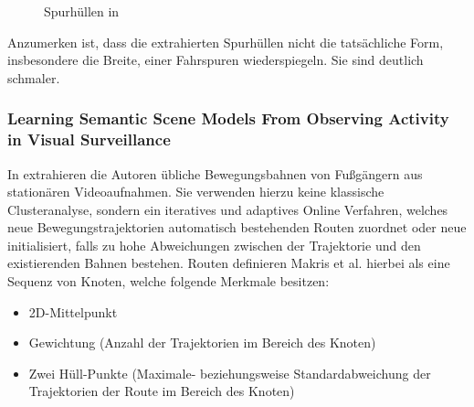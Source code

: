 \begin{figure}[H]
    \centering
    \caption[Spurhüllen in Hu et al., 2006]{Spurhüllen in \cite[]{WeimingHu2006}}
    \label{fig:relw_hu_example_envelope}
\end{figure}

Anzumerken ist, dass die extrahierten Spurhüllen nicht die tatsächliche Form, insbesondere die Breite, einer Fahrspuren
wiederspiegeln. Sie sind deutlich schmaler.


\subsubsection*{Learning Semantic Scene Models From Observing Activity in Visual Surveillance}
In \cite[]{Makris2005} extrahieren die Autoren übliche Bewegungsbahnen von Fußgängern aus stationären Videoaufnahmen.
Sie verwenden hierzu keine klassische Clusteranalyse, sondern ein iteratives und adaptives Online Verfahren,
welches neue Bewegungstrajektorien automatisch bestehenden Routen zuordnet oder neue initialisiert,
falls zu hohe Abweichungen zwischen der Trajektorie und den existierenden Bahnen bestehen.
Routen definieren Makris et al. hierbei als eine Sequenz von Knoten, welche folgende Merkmale besitzen:

\begin{itemize}
    \item 2D-Mittelpunkt
    \item Gewichtung (Anzahl der Trajektorien im Bereich des Knoten)
    \item Zwei Hüll-Punkte (Maximale- beziehungsweise Standardabweichung der Trajektorien der Route im Bereich des Knoten)
\end{itemize}

